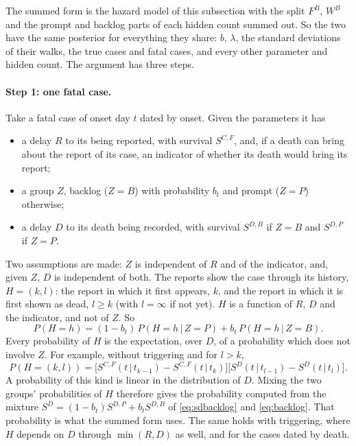 \documentclass[11pt,a4paper]{article}
\newcommand{\given}{\,|\,}
\begin{document}
The summed form is the hazard model of this subsection with the split
$F^{B}$, $W^{B}$ and the prompt and backlog parts of each hidden count
summed out. So the two have the same posterior for everything they share:
$b$, $\lambda$, the standard deviations of their walks, the true cases and
fatal cases, and every other parameter and hidden count. The argument has
three steps.

\paragraph{Step 1: one fatal case.} Take a fatal case of onset day $t$
dated by onset. Given the parameters it has
\begin{itemize}
\item a delay $R$ to its being reported, with survival $S^{C,F}$, and, if a
death can bring about the report of its case, an indicator of whether its
death would bring its report;
\item a group $Z$, backlog ($Z=B$) with probability $b_t$ and prompt ($Z=P$)
otherwise;
\item a delay $D$ to its death being recorded, with survival $S^{D,B}$ if
$Z=B$ and $S^{D,P}$ if $Z=P$.
\end{itemize}
Two assumptions are made: $Z$ is independent of $R$ and of the indicator,
and, given $Z$, $D$ is independent of both. The reports show the case
through its history, $H=(k,l)$: the report in which it first appears, $k$,
and the report in which it is first shown as dead, $l\ge k$ (with $l=\infty$
if not yet). $H$ is a function of $R$, $D$ and the indicator, and not of $Z$.
So
\[
P(H=h)=(1-b_t)\,P(H=h\given Z=P)+b_t\,P(H=h\given Z=B).
\]
Every probability of $H$ is the expectation, over $D$, of a probability
which does not involve $Z$. For example, without triggering and for $l>k$,
\[
P(H=(k,l))=\bigl[S^{C,F}(t\given t_{k-1})-S^{C,F}(t\given t_k)\bigr]
\bigl[S^{D}(t\given t_{l-1})-S^{D}(t\given t_l)\bigr].
\]
A probability of this kind is linear in the distribution of $D$. Mixing the
two groups' probabilities of $H$ therefore gives the probability computed
from the mixture $S^{D}=(1-b_t)S^{D,P}+b_tS^{D,B}$ of
\eqref{eq:sdbacklog} and \eqref{eq:backlog}. That probability is what the
summed form uses. The same holds with triggering, where $H$ depends on $D$
through $\min(R,D)$ as well, and for the cases dated by death.
\end{document}
